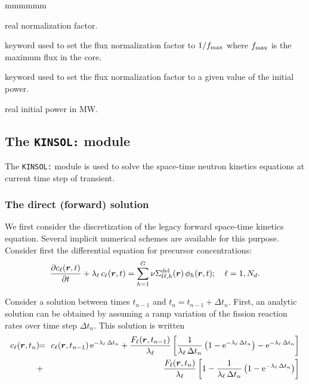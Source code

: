 \begin{ListeDeDescription}{mmmmmm}
\item[\dusa{fnorm}] real normalization factor.

\item[\moc{MAX}] keyword used to set the flux normalization factor to $1/f_{\rm max}$ where $f_{\rm max}$ is
the maximum flux in the core.

\item[\moc{POWER-INI}] keyword used to set the flux normalization factor to a given value of the initial power.

\item[\dusa{power}] real initial power in MW.

\end{ListeDeDescription}
\clearpage

\subsection{The {\tt KINSOL:} module}\label{sect:kinsol}

The {\tt KINSOL:} module is used  to solve the space-time neutron kinetics equations at current time step of transient.

\subsubsection{The direct (forward) solution}

We first consider the discretization of the legacy forward space-time kinetics equation. Several implicit numerical schemes are available for this purpose.
Consider first the differential equation for precursor concentrations:
\begin{equation}
{\partial c_{\ell}(\bff(r),t) \over \partial t}+\lambda_\ell \, c_{\ell}(\bff(r),t) =\sum_{h=1}^G \nu\Sigma_{{\rm f}\ell,h}^{\rm del}(\bff(r)) \, \phi_h(\bff(r),t); \ \ \
\ell=1,N_d.
\label{eq:eq_inikin_2}
\end{equation}

Consider a solution between times $t_{n-1}$ and $t_{n}=t_{n-1}+\Delta t_n$. First, an analytic solution can be obtained by assuming a ramp
variation of the fission reaction rates over time step $\Delta t_n$. This solution is written
\begin{eqnarray}
\nonumber c_{\ell}(\bff(r),t_n)\negthinspace\negthinspace&=&\negthinspace\negthinspace c_{\ell}(\bff(r),t_{n-1}) \, {\rm e}^{-\lambda_\ell \, \Delta t_n}+{F_\ell(\bff(r),t_{n-1})\over \lambda_\ell} \left[
{1\over\lambda_\ell \, \Delta t_n}\left( 1- {\rm e}^{-\lambda_\ell \, \Delta t_n}\right)-{\rm e}^{-\lambda_\ell \, \Delta t_n} \right] \\
&+&\negthinspace\negthinspace {F_\ell(\bff(r),t_n)\over \lambda_\ell} \left[ 1-{1\over\lambda_\ell \, \Delta t_n}\left( 1- {\rm e}^{-\lambda_\ell \, \Delta t_n}\right) \right] 
\label{eq:eq_inikin_3}
\end{eqnarray}

